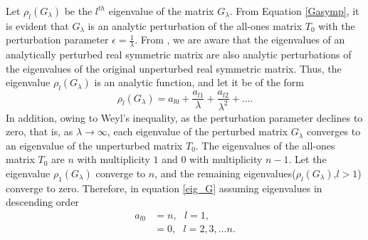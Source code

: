 \documentclass[multixcb]{amstext-l}
\theoremstyle{plain}
\theoremstyle{definition}
\theoremstyle{definition}
\theoremstyle{remark}
\numberwithin{equation}{chapter}
\begin{document}
Let $\rho_l(G_{\lambda})$ be the $l^{th}$ eigenvalue of the matrix $G_{\lambda}$. From Equation \ref{Gasymp}, it is evident that $G_{\lambda}$ is an analytic perturbation of the all-ones matrix $T_0$ with the perturbation parameter $\epsilon = \frac{1}{\lambda}$. From \cite{kato2013perturbation}, we are aware that the eigenvalues of an analytically perturbed real symmetric matrix are also analytic perturbations of the eigenvalues of the original unperturbed real symmetric matrix. Thus, the eigenvalue $\rho_l(G_{\lambda})$ is an analytic function, and let it be of the form
\begin{equation}\label{eig_G}
\rho_l(G_{\lambda}) = a_{l0} + \frac{a_{l1}}{\lambda} +\frac{a_{l2}}{\lambda^2}+\ldots.
\end{equation}
In addition, owing to Weyl's inequality, as the perturbation parameter declines to zero, that is, as $\lambda\to\infty$, each eigenvalue of the perturbed matrix $G_{\lambda}$ converges to an eigenvalue of the unperturbed matrix $T_0$. The eigenvalues of the all-ones matrix $T_0$ are $n$ with multiplicity $1$ and $0$ with multiplicity $n-1$. Let the eigenvalue $\rho_1(G_{\lambda})$ converge to $n$, and the remaining eigenvalues($\rho_l(G_{\lambda})$,$l>1$) converge to zero. Therefore, in equation \ref{eig_G} assuming eigenvalues in descending order\begin{equation}\label{eig_ones}\begin{aligned}
a_{l0} &= n,\mbox{    } l = 1,\\
          &= 0, \mbox{    } l = 2,3,\ldots n.
          \end{aligned}
          \end{equation}
          
\end{document}
